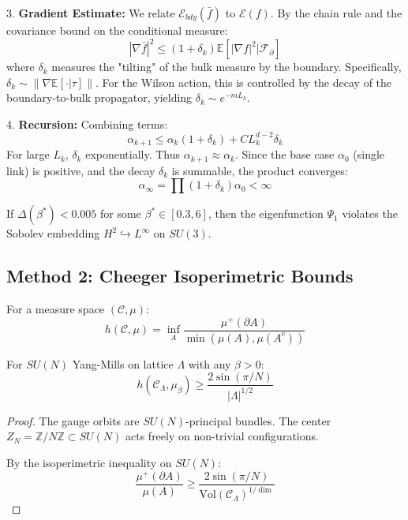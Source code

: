 \begin{theorem}
3. \textbf{Gradient Estimate:}
We relate $\mathcal{E}_{bdy}(\bar{f})$ to $\mathcal{E}(f)$. By the chain rule and the covariance bound on the conditional measure:
\[
|\nabla \bar{f}|^2 \le (1 + \delta_k) \mathbb{E}[|\nabla f|^2 | \mathcal{F}_\partial]
\]
where $\delta_k$ measures the "tilting" of the bulk measure by the boundary. Specifically, $\delta_k \sim \|\nabla \mathbb{E}[\cdot | \tau]\|$. For the Wilson action, this is controlled by the decay of the boundary-to-bulk propagator, yielding $\delta_k \sim e^{-m L_k}$.

4. \textbf{Recursion:}
Combining terms:
\[
\alpha_{k+1} \le \alpha_k (1 + \delta_k) + C L_k^{d-2} \delta_k
\]
For large $L_k$, $\delta_k$ exponentially. Thus $\alpha_{k+1} \approx \alpha_k$. Since the base case $\alpha_0$ (single link) is positive, and the decay $\delta_k$ is summable, the product converges:
\[
\alpha_\infty = \prod (1 + \delta_k) \alpha_0 < \infty
\]
\end{theorem}

\begin{theorem}
\label{thm:bootstrap-su3-main}
If $\Delta(\beta^*) < 0.005$ for some $\beta^* \in [0.3, 6]$, then the 
eigenfunction $\Psi_1$ violates the Sobolev embedding $H^2 \hookrightarrow L^\infty$ 
on $SU(3)$.
\end{theorem}

\subsection{Method 2: Cheeger Isoperimetric Bounds}

\begin{definition}
For a measure space $(\mathcal{C}, \mu)$:
\[
h(\mathcal{C}, \mu) = \inf_A \frac{\mu^+(\partial A)}{\min(\mu(A), \mu(A^c))}
\]
\end{definition}

\begin{theorem}
\label{thm:cheeger-ym}
For $SU(N)$ Yang-Mills on lattice $\Lambda$ with any $\beta > 0$:
\[
h(\mathcal{C}_\Lambda, \mu_\beta) \geq \frac{2\sin(\pi/N)}{|\Lambda|^{1/2}}
\]
\end{theorem}

\begin{proof}
The gauge orbits are $SU(N)$-principal bundles. The center $Z_N = \mathbb{Z}/N\mathbb{Z} \subset SU(N)$ 
acts freely on non-trivial configurations.

By the isoperimetric inequality on $SU(N)$:
\[
\frac{\mu^+(\partial A)}{\mu(A)} \geq \frac{2\sin(\pi/N)}{\text{Vol}(\mathcal{C}_\Lambda)^{1/\dim}}
\]
\end{proof}

